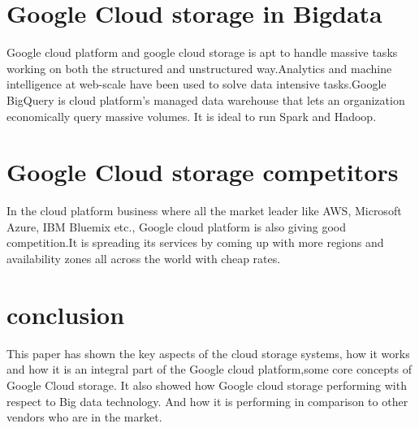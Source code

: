 \documentclass[9pt,twocolumn,twoside]{../../styles/osajnl}
\begin{document}
\section{Google Cloud storage in Bigdata}

Google cloud platform and google cloud storage is apt to handle massive tasks working on both the structured and unstructured way.Analytics and machine intelligence at web-scale have been used to solve data intensive tasks.Google BigQuery \cite{www-google-bigquery} is cloud platform's  managed data warehouse that lets an organization economically query massive volumes. It is ideal to run Spark and Hadoop.

\section{Google Cloud storage competitors}
In the cloud platform business where all the market leader like AWS, Microsoft Azure, IBM Bluemix etc., Google cloud platform is also giving good competition.It is spreading its services by coming up with more regions and availability zones all across the world with cheap rates. 

\section{conclusion}
This paper has shown the key aspects of the cloud storage systems, how it works and how it is an integral part of the Google cloud platform,some core concepts of Google Cloud storage. It also showed how Google cloud storage performing with respect to Big data technology. And how it is performing in comparison to other vendors who are in the market.


\end{document}
